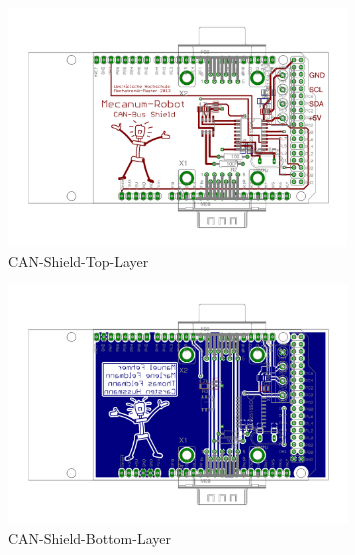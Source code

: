 \begin{figure}[H]
\centering
 \includegraphics[width=0.8\textwidth]{Abbildungen/CAN-Shield-Layout-Top}
\caption[CAN-Shield-Top-Layer]{CAN-Shield-Top-Layer}
\label{fig:CAN-Shield-Layout-Top}
\end{figure}

\begin{figure}[H]
\centering
 \includegraphics[width=0.8\textwidth]{Abbildungen/CAN-Shield-Layout-Bottom}
\caption[CAN-Shield-Bottom-Layer]{CAN-Shield-Bottom-Layer}
\label{fig:CAN-Shield-Layout-Bottom}
\end{figure}


